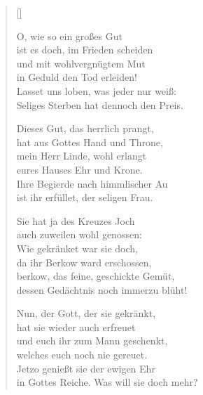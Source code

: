 \begin{multicols}{2}
\settowidth{\versewidth}{Nun, der Gott, der sie gekränkt,}
\begin{verse}[\versewidth]

 O, wie so ein großes Gut\\
ist es doch, im Frieden scheiden\\
und mit wohlvergnügtem Mut\\
in Geduld den Tod erleiden!\\
Lasset uns loben, was jeder nur weiß:\\
Seliges Sterben hat dennoch den Preis.

 Dieses Gut, das herrlich prangt,\\
hat aus Gottes Hand und Throne,\\
mein Herr Linde, wohl erlangt\\
eures Hauses Ehr und Krone.\\
Ihre Begierde nach himmlischer Au\\
ist ihr erfüllet, der seligen Frau.

 Sie hat ja des Kreuzes Joch\\
auch zuweilen wohl genossen:\\
Wie gekränket war sie doch,\\
da ihr Berkow ward erschossen,\\
berkow, das feine, geschickte Gemüt,\\
dessen Gedächtnis noch immerzu blüht!

 Nun, der Gott, der sie gekränkt,\\
hat sie wieder auch erfreuet\\
und euch ihr zum Mann geschenkt,\\
welches euch noch nie gereuet.\\
Jetzo genießt sie der ewigen Ehr\\
in Gottes Reiche. Was will sie doch mehr?

\end{verse}
\end{multicols}
